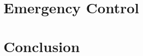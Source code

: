 \documentclass[12pt]{report}
\begin{document}
\chapter{Emergency Control}
\label{Chapter6}






\chapter{Conclusion}
\label{Chapter7}




\end{document}
